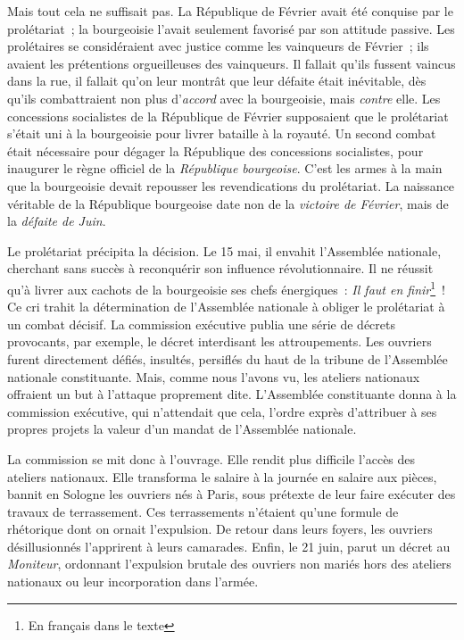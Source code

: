 \documentclass[twoside]{book} %
\begin{document}
Mais tout cela ne suffisait pas. La République de Février avait été conquise par le prolétariat ; la bourgeoisie l’avait seulement favorisé par son attitude passive. Les prolétaires se considéraient avec justice comme les vainqueurs de Février ; ils avaient les prétentions orgueilleuses des vainqueurs. Il fallait qu’ils fussent vaincus dans la rue, il fallait qu’on leur montrât que leur défaite était inévitable, dès qu’ils combattraient non plus d’\emph{accord} avec la bourgeoisie, mais \emph{contre} elle. Les concessions socialistes de la République de Février supposaient que le prolétariat s’était uni à la bourgeoisie pour livrer bataille à la royauté. Un second combat était nécessaire pour dégager la République des concessions socialistes, pour inaugurer le règne officiel de la \emph{République bourgeoise}. C’est les armes à la main que la bourgeoisie devait repousser les revendications du prolétariat. La naissance véritable de la République bourgeoise date non de la \emph{victoire de Février}, mais de la \emph{défaite de Juin}.\par
Le prolétariat précipita la décision. Le 15 mai, il envahit l’Assemblée nationale, cherchant sans succès à reconquérir son influence révolutionnaire. Il ne réussit qu’à livrer aux cachots de la bourgeoisie ses chefs énergiques : \emph{Il faut en finir}\footnote{En français dans le texte} ! Ce cri trahit la détermination de l’Assemblée nationale à obliger le prolétariat à un combat décisif. La commission exécutive publia une série de décrets provocants, par exemple, le décret interdisant les attroupements. Les ouvriers furent directement défiés, insultés, persiflés du haut de la tribune de l’Assemblée nationale constituante. Mais, comme nous l’avons vu, les ateliers nationaux offraient un but à l’attaque proprement dite. L’Assemblée constituante donna à la commission exécutive, qui n’attendait que cela, l’ordre exprès d’attribuer à ses propres projets la valeur d’un mandat de l’Assemblée nationale.\par
La commission se mit donc à l’ouvrage. Elle rendit plus difficile l’accès des ateliers nationaux. Elle transforma le salaire à la journée en salaire aux pièces, bannit en Sologne les ouvriers nés à Paris, sous prétexte de leur faire exécuter des travaux de terrassement. Ces terrassements n’étaient qu’une formule de rhétorique dont on ornait l’expulsion. De retour dans leurs foyers, les ouvriers désillusionnés l’apprirent à leurs camarades. Enfin, le 21 juin, parut un décret au \emph{Moniteur}, ordonnant l’expulsion brutale des ouvriers non mariés hors des ateliers nationaux ou leur incorporation dans l’armée.\par
\end{document}
